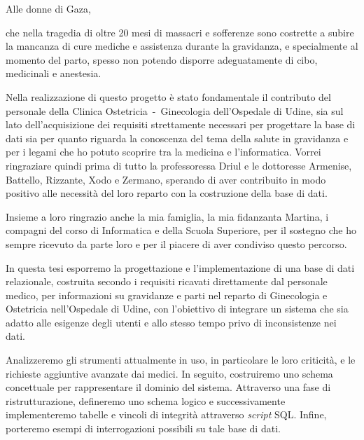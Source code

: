 \begin{dedication}
Alle donne di Gaza,
\par che nella tragedia di oltre 20 mesi di massacri e sofferenze sono costrette a subire la mancanza di cure mediche e assistenza durante la gravidanza, e specialmente al momento del parto, spesso non potendo disporre adeguatamente di cibo, medicinali e anestesia.
\end{dedication}

\acknowledgements
Nella realizzazione di questo progetto è stato fondamentale il contributo del personale della Clinica Ostetricia~-~Ginecologia dell'Ospedale di Udine, sia sul lato dell'acquisizione dei requisiti strettamente necessari per progettare la base di dati sia per quanto riguarda la conoscenza del tema della salute in gravidanza e per i legami che ho potuto scoprire tra la medicina e l'informatica.
Vorrei ringraziare quindi prima di tutto la professoressa Driul e le dottoresse Armenise, Battello, Rizzante, Xodo e Zermano, sperando di aver contribuito in modo positivo alle necessità del loro reparto con la costruzione della base di dati.

Insieme a loro ringrazio anche la mia famiglia, la mia fidanzanta Martina, i compagni del corso di Informatica e della Scuola Superiore, per il sostegno che ho sempre ricevuto da parte loro e per il piacere di aver condiviso questo percorso.

\abstract
In questa tesi esporremo la progettazione e l'implementazione di una base di dati relazionale, costruita secondo i requisiti ricavati direttamente dal personale medico, per informazioni su gravidanze e parti nel reparto di Ginecologia e Ostetricia nell'Ospedale di Udine, con l'obiettivo di integrare un sistema che sia adatto alle esigenze degli utenti e allo stesso tempo privo di inconsistenze nei dati.

Analizzeremo gli strumenti attualmente in uso, in particolare le loro criticità, e le richieste aggiuntive avanzate dai medici. In seguito, costruiremo uno schema concettuale per rappresentare il dominio del sistema. Attraverso una fase di ristrutturazione, defineremo uno schema logico e successivamente implementeremo tabelle e vincoli di integrità attraverso \emph{script} SQL. Infine, porteremo esempi di interrogazioni possibili su tale base di dati.
